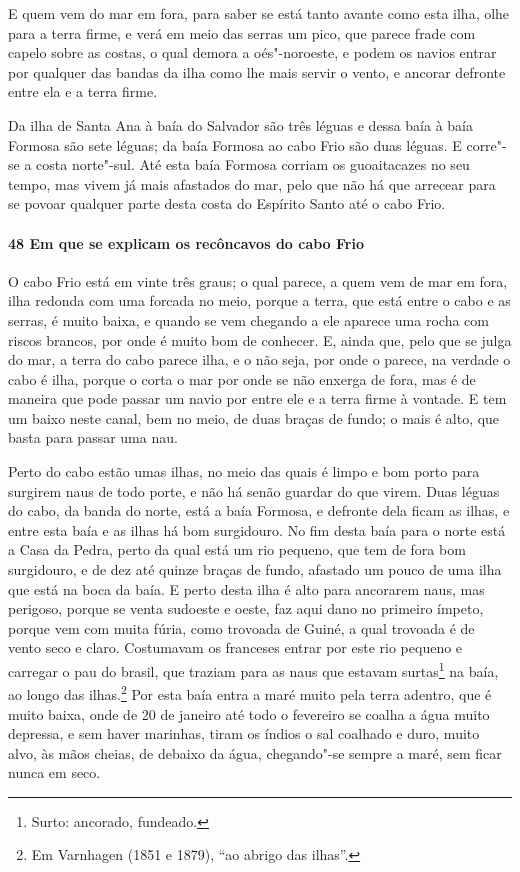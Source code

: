 E quem vem do mar em fora, para saber se está tanto avante como esta ilha, olhe para a
terra firme, e verá em meio das serras um pico, que parece frade com capelo sobre as
costas, o qual demora a oés"-noroeste, e podem os navios entrar por qualquer das bandas da
ilha como lhe mais servir o vento, e ancorar defronte entre ela e a terra firme.

Da ilha de Santa Ana à baía do Salvador são três léguas e dessa baía à baía Formosa são
sete léguas; da baía Formosa ao cabo Frio são duas léguas. E corre"-se a costa norte"-sul.
Até esta baía Formosa corriam os guoaitacazes no seu tempo, mas vivem já mais afastados do
mar, pelo que não há que arrecear para se povoar qualquer parte desta costa do Espírito
Santo até o cabo Frio.

\paragraph{48 Em que se explicam os recôncavos do cabo Frio}

O cabo Frio está em vinte três graus; o qual parece, a quem vem de mar em fora, ilha
redonda com uma forcada no meio, porque a terra, que está entre o cabo e as serras, é
muito baixa, e quando se vem chegando a ele aparece uma rocha com riscos brancos, por onde
é muito bom de conhecer. E, ainda que, pelo que se julga do mar, a terra do cabo parece
ilha, e o não seja, por onde o parece, na verdade o cabo é ilha, porque o corta o mar por
onde se não enxerga de fora, mas é de maneira que pode passar um navio por entre ele e a
terra firme à vontade. E tem um baixo neste canal, bem no meio, de duas braças de fundo; o
mais é alto, que basta para passar uma nau.

Perto do cabo estão umas ilhas, no meio das quais é limpo e bom porto para surgirem naus
de todo porte, e não há senão guardar do que virem. Duas léguas do cabo, da banda do
norte, está a baía Formosa, e defronte dela ficam as ilhas, e entre esta baía e as ilhas
há bom surgidouro. No fim desta baía para o norte está a Casa da Pedra, perto da qual está
um rio pequeno, que tem de fora bom surgidouro, e de dez até quinze braças de fundo,
afastado um pouco de uma ilha que está na boca da baía. E perto desta ilha é alto para
ancorarem naus, mas perigoso, porque se venta sudoeste e oeste, faz aqui dano no primeiro
ímpeto, porque vem com muita fúria, como trovoada de Guiné, a qual trovoada é de vento
seco e claro. Costumavam os franceses entrar por este rio pequeno e carregar o pau do
brasil, que traziam para as naus que estavam surtas\footnote{ Surto: ancorado, fundeado.}
na baía, ao longo das ilhas.\footnote{ Em Varnhagen (1851 e 1879), ``ao abrigo das
ilhas''.} Por esta baía entra a maré muito pela terra adentro, que é muito baixa, onde de
20 de janeiro até todo o fevereiro se coalha a água muito depressa, e sem haver marinhas,
tiram os índios o sal coalhado e duro, muito alvo, às mãos cheias, de debaixo da água,
chegando"-se sempre a maré, sem ficar nunca em seco.

